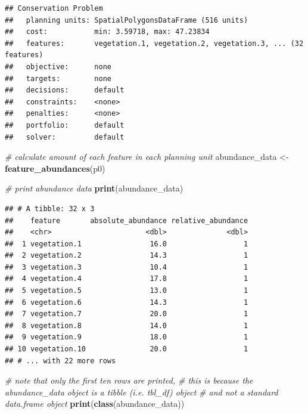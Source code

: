 \documentclass[12pt,]{book}
\newenvironment{Shaded}{\begin{snugshade}}{\end{snugshade}}
\newcommand{\KeywordTok}[1]{\textcolor[rgb]{0.13,0.29,0.53}{\textbf{#1}}}
\newcommand{\StringTok}[1]{\textcolor[rgb]{0.31,0.60,0.02}{#1}}
\newcommand{\CommentTok}[1]{\textcolor[rgb]{0.56,0.35,0.01}{\textit{#1}}}
\newcommand{\NormalTok}[1]{#1}
\begin{document}
\begin{verbatim}
## Conservation Problem
##   planning units: SpatialPolygonsDataFrame (516 units)
##   cost:           min: 3.59718, max: 47.23834
##   features:       vegetation.1, vegetation.2, vegetation.3, ... (32 features)
##   objective:      none
##   targets:        none
##   decisions:      default
##   constraints:    <none>
##   penalties:      <none>
##   portfolio:      default
##   solver:         default
\end{verbatim}

\begin{Shaded}
\begin{Highlighting}[]
\CommentTok{# calculate amount of each feature in each planning unit}
\NormalTok{abundance_data <-}\StringTok{ }\KeywordTok{feature_abundances}\NormalTok{(p0)}

\CommentTok{# print abundance data}
\KeywordTok{print}\NormalTok{(abundance_data)}
\end{Highlighting}
\end{Shaded}

\begin{verbatim}
## # A tibble: 32 x 3
##    feature       absolute_abundance relative_abundance
##    <chr>                      <dbl>              <dbl>
##  1 vegetation.1                16.0                  1
##  2 vegetation.2                14.3                  1
##  3 vegetation.3                10.4                  1
##  4 vegetation.4                17.8                  1
##  5 vegetation.5                13.0                  1
##  6 vegetation.6                14.3                  1
##  7 vegetation.7                20.0                  1
##  8 vegetation.8                14.0                  1
##  9 vegetation.9                18.0                  1
## 10 vegetation.10               20.0                  1
## # ... with 22 more rows
\end{verbatim}

\clearpage

\begin{Shaded}
\begin{Highlighting}[]
\CommentTok{# note that only the first ten rows are printed,}
\CommentTok{# this is because the abundance_data object is a tibble (i.e. tbl_df) object}
\CommentTok{# and not a standard data.frame object}
\KeywordTok{print}\NormalTok{(}\KeywordTok{class}\NormalTok{(abundance_data))}
\end{Highlighting}
\end{Shaded}
\end{document}
